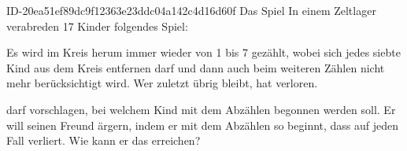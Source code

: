 \begin{exercise}
      {ID-20ea51ef89dc9f12363e23ddc04a142c4d16d60f}
      {Das Spiel}
  \ifproblem\problem
    In einem Zeltlager verabreden 17 Kinder folgendes Spiel:\par
    Es wird im Kreis herum immer wieder von 1 bis 7 gezählt, wobei sich jedes
    siebte Kind aus dem Kreis entfernen darf und dann auch beim weiteren
    Zählen nicht mehr berücksichtigt wird. Wer zuletzt übrig bleibt, hat
    verloren.\par
    \xya{} darf vorschlagen, bei welchem Kind mit dem Abzählen begonnen
    werden soll. Er will seinen Freund \xyb{} ärgern, indem er mit dem
    Abzählen so beginnt, dass \xyb{} auf jeden Fall verliert. Wie kann
    er das erreichen?
  \fi
\end{exercise}
